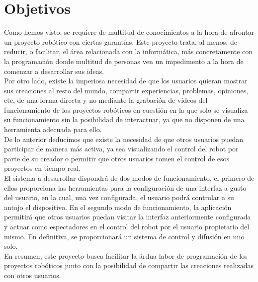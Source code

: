 

\section{Objetivos}
\label{sec:objetivos}

Como hemos visto, se requiere de multitud de conocimientos a la hora de afrontar un proyecto robótico con ciertas garantías. Este proyecto trata, al menos, de reducir, o facilitar, el área relacionada con
la informática, más concretamente con la programación donde multitud de personas ven un impedimento a la hora de comenzar a desarrollar sus ideas.\\

Por otro lado, existe la imperiosa necesidad de que los usuarios quieran mostrar sus creaciones al resto del mundo, compartir experiencias, problemas, opiniones, etc, de una forma directa y no
mediante la grabación de vídeos del funcionamiento de los proyectos robóticos en cuestión en la que solo se visualiza su funcionamiento sin la posibilidad de interactuar, ya que no disponen de una herramienta adecuada para ello.\\

De lo anterior deducimos que existe la necesidad de que otros usuarios puedan participar de manera más activa, ya sea visualizando el control del robot por parte de su creador o permitir que otros usuarios
tomen el control de esos proyectos en tiempo real.\\

El sistema a desarrollar dispondrá de dos modos de funcionamiento, el primero de ellos proporciona las herramientas para la configuración de una interfaz a gusto del usuario, en la cual, 
una vez configurada, el usuario podrá controlar a su antojo el dispositivo. En el segundo modo de funcionamiento, la aplicación permitirá que otros usuarios puedan visitar la interfaz anteriormente 
configurada y actuar como espectadores en el control del robot por el usuario propietario del mismo. En definitiva, se proporcionará un sistema de control y difusión en uno solo.\\


En resumen, este proyecto busca facilitar la árdua labor de programación de los proyectos robóticos junto con la posibilidad de compartir las creaciones realizadas con otros usuarios.\\


